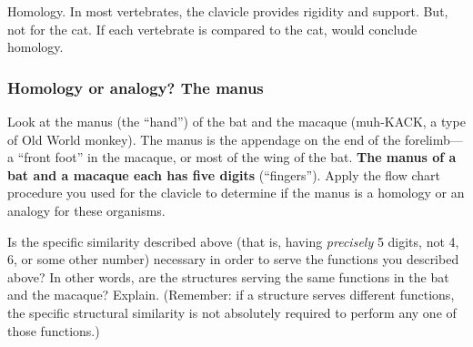 \documentclass[12pt, hidelinks]{exam}
\newcommand*\AnswerBox[2]{%
    \parbox[t][#1]{0.92\textwidth}{%
    \begin{solution}#2\end{solution}}
    \vspace{\stretch{1}}
}
\begin{document}
\begin{questions}
\begin{parts}
	\AnswerBox{2\baselineskip}{Homology. In most vertebrates, the clavicle provides rigidity and support. But, not for the cat. If each vertebrate is compared to the cat, would conclude homology.}

\end{parts}

\subsubsection*{Homology or analogy? The manus}

\question
Look at the manus (the ``hand'') of the bat and the macaque (muh-KACK, a type of Old World monkey).   The manus is the appendage on the end of the forelimb---a ``front foot'' in the macaque, or most of  the wing of the bat. %
\textbf{The manus of a bat and a macaque each has five digits} (``fingers''). Apply the flow chart procedure you used for the clavicle to determine if the manus is a homology or an analogy for these organisms.


\question
Is the specific similarity described above (that is, having \emph{precisely} 5 digits, not 4, 6, or some other number) necessary in order to serve the functions you described above?  In other words, are the structures serving the same functions in the bat and the macaque? Explain. (Remember: if a structure serves different functions, the specific structural similarity is not absolutely required to perform any one of those functions.)


\end{questions}
\end{document}
